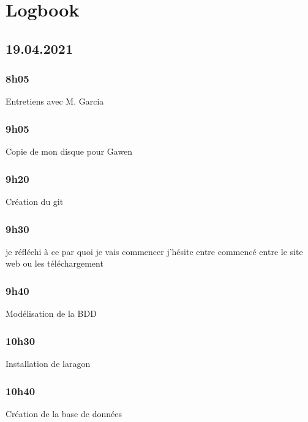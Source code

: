 \documentclass[a4paper,12pt,french]{sphinxmanual}
\begin{document}
\chapter{Logbook}
\label{\detokenize{logbook:logbook}}\label{\detokenize{logbook::doc}}

\section{19.04.2021}
\label{\detokenize{logbook:id1}}

\subsection{8h05}
\label{\detokenize{logbook:h05}}
\sphinxAtStartPar
Entretiens avec M. Garcia


\subsection{9h05}
\label{\detokenize{logbook:id2}}
\sphinxAtStartPar
Copie de mon disque pour Gawen


\subsection{9h20}
\label{\detokenize{logbook:h20}}
\sphinxAtStartPar
Création du git


\subsection{9h30}
\label{\detokenize{logbook:h30}}
\sphinxAtStartPar
je réfléchi à ce par quoi je vais commencer j’hésite entre commencé entre le site web ou les téléchargement


\subsection{9h40}
\label{\detokenize{logbook:h40}}
\sphinxAtStartPar
Modélisation de la BDD

\sphinxAtStartPar
{}


\subsection{10h30}
\label{\detokenize{logbook:id3}}
\sphinxAtStartPar
Installation de laragon


\subsection{10h40}
\label{\detokenize{logbook:id4}}
\sphinxAtStartPar
Création de la base de données
\end{document}

